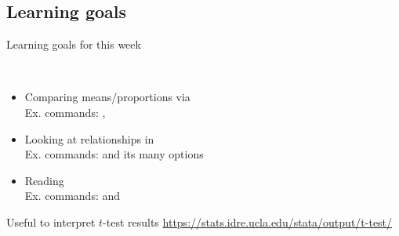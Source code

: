 \documentclass[t]{beamer}
\begin{document}
  \subsection{Learning goals}

 \begin{frame}[t]{Learning goals for this week}

   \\[1em]

	\begin{itemize}
		\item Comparing means/proportions via \\[.5em]%
      Ex. commands: , \\[.5em]%
		\item Looking at  relationships in \\[.5em]%
      Ex. commands:  and its many options\\[.5em]%
		\item Reading \\[.5em]%
      Ex. commands:  and \\[.5em]%
	\end{itemize}

    \begin{block}{Useful to interpret $t$-test results}
       \url{https://stats.idre.ucla.edu/stata/output/t-test/}
    \end{block}

  \end{frame}
\end{document}
